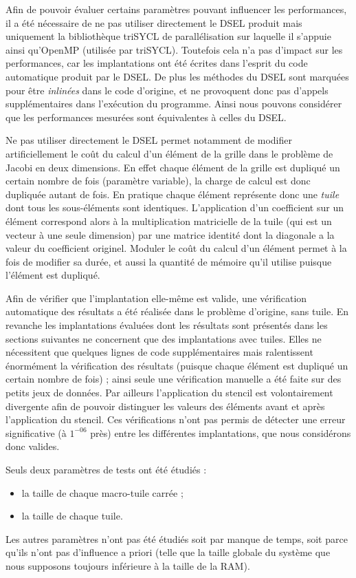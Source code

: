 Afin de pouvoir évaluer certains paramètres pouvant influencer les performances, il a été nécessaire de ne pas utiliser directement le DSEL produit mais uniquement la bibliothèque \textsf{triSYCL} de parallélisation sur laquelle il s'appuie ainsi qu'\textsf{OpenMP} (utilisée par \textsf{triSYCL}). Toutefois cela n'a pas d'impact sur les performances, car les implantations ont été écrites dans l'esprit du code automatique produit par le DSEL. De plus les méthodes du DSEL sont marquées pour être \emph{inlinées} dans le code d'origine, et ne provoquent donc pas d'appels supplémentaires dans l'exécution du programme. Ainsi nous pouvons considérer que les performances mesurées sont équivalentes à celles du DSEL.

Ne pas utiliser directement le DSEL permet notamment de modifier artificiellement le coût du calcul d'un élément de la grille dans le problème de Jacobi en deux dimensions. En effet chaque élément de la grille est dupliqué un certain nombre de fois (paramètre variable), la charge de calcul est donc dupliquée autant de fois. En pratique chaque élément représente donc une \emph{tuile} dont tous les sous-éléments sont identiques. L'application d'un coefficient sur un élément correspond alors à la multiplication matricielle de la tuile (qui est un vecteur à une seule dimension) par une matrice identité dont la diagonale a la valeur du coefficient originel. Moduler le coût du calcul d'un élément permet à la fois de modifier sa durée, et aussi la quantité de mémoire qu'il utilise puisque l'élément est dupliqué.

Afin de vérifier que l'implantation elle-même est valide, une vérification automatique des résultats a été réalisée dans le problème d'origine, sans tuile. En revanche les implantations évaluées dont les résultats sont présentés dans les sections suivantes ne concernent que des implantations avec tuiles. Elles ne nécessitent que quelques lignes de code supplémentaires mais ralentissent énormément la vérification des résultats (puisque chaque élément est dupliqué un certain nombre de fois) ; ainsi seule une vérification manuelle a été faite sur des petits jeux de données. Par ailleurs l'application du stencil est volontairement divergente afin de pouvoir distinguer les valeurs des éléments avant et après l'application du stencil. Ces vérifications n'ont pas permis de détecter une erreur significative (à $1^{-06}$ près) entre les différentes implantations, que nous considérons donc valides. 

Seuls deux paramètres de tests ont été étudiés :
\begin{itemize}
\item la taille de chaque macro-tuile carrée ;
\item la taille de chaque tuile.
\end{itemize}
Les autres paramètres n'ont pas été étudiés soit par manque de temps, soit parce qu'ils n'ont pas d'influence a priori (telle que la taille globale du système que nous supposons toujours inférieure à la taille de la RAM).

